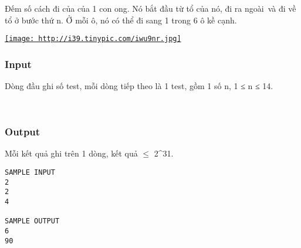 

Đếm số cách đi của của 1 con ong. Nó bắt đầu từ tổ của nó, đi ra ngoài và đi về tổ ở bước thứ n. Ở mỗi ô, nó có thể đi sang 1 trong 6 ô kề cạnh.

\href{http://tinypic.com}{
\texttt{[image: http://i39.tinypic.com/iwu9nr.jpg]}}

\subsubsection{Input}

Dòng đầu ghi số test, mỗi dòng tiếp theo là 1 test, gồm 1 số n, 1 ≤ n ≤ 14.

 

\subsubsection{Output}

Mỗi kết quả ghi trên 1 dòng, kết quả  $\le$  2\textasciicircum31.
\begin{verbatim}
SAMPLE INPUT
2
2
4

SAMPLE OUTPUT
6
90
\end{verbatim}
